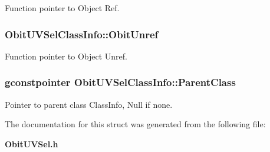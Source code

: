Function pointer to Object Ref. 

\subsubsection{ {\bf Obit\-UVSel\-Class\-Info::Obit\-Unref}}\label{structObitUVSelClassInfo_o11}


Function pointer to Object Unref. 

\subsubsection{\setlength{\rightskip}{0pt plus 5cm}gconstpointer {\bf Obit\-UVSel\-Class\-Info::Parent\-Class}}\label{structObitUVSelClassInfo_o3}


Pointer to parent class Class\-Info, Null if none. 



The documentation for this struct was generated from the following file:\begin{CompactItemize}
\item 
{\bf Obit\-UVSel.h}\end{CompactItemize}
